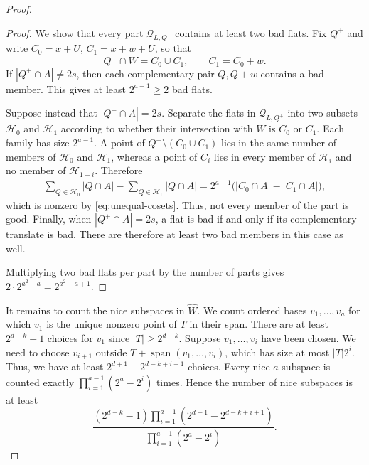 \documentclass[reqno]{amsart}
\theoremstyle{definition}
\theoremstyle{remark}
\newcommand{\cQ}{\mathcal Q}
\newcommand{\cH}{\mathcal H}
\DeclareMathOperator{\Span}{span}
\begin{document}
\begin{proof}
\begin{proof}
We show that every part $\cQ_{L, Q^+}$ contains at least two bad flats.  Fix $Q^+$ and
write $C_0 = x+U$, $C_1 = x+w+U$, so that
\[
  Q^+\cap W=C_0\cup C_1,
  \qquad C_1=C_0+w.
\]
If
$|Q^+\cap A|\ne 2s$, then each complementary pair
$Q,Q+w$ contains a bad member.  This gives at least
$2^{a-1}\ge2$ bad flats.

Suppose instead that $|Q^+\cap A|=2s$.  Separate the flats in $\cQ_{L, Q^+}$
into two subsets $\cH_0$ and $\cH_1$ according to whether their intersection with
$W$ is $C_0$ or $C_1$.  Each family has size $2^{a-1}$.  A point of
$Q^+\setminus(C_0\cup C_1)$ lies in the same number of members of
$\cH_0$ and $\cH_1$, whereas a point of $C_i$ lies in every member of
$\cH_i$ and no member of $\cH_{1-i}$.  Therefore
\[
\begin{split}
  \sum_{Q\in\cH_0}|Q\cap A|
  -\sum_{Q\in\cH_1}|Q\cap A|
  =2^{a-1}\bigl(|C_0\cap A|-|C_1\cap A|\bigr),
\end{split}
\]
which is nonzero by \eqref{eq:unequal-cosets}.  Thus, not every member
of the part is good.  Finally, when $|Q^+\cap A|=2s$, a flat is bad if
and only if its complementary translate is bad.  There are therefore
at least two bad members in this case as well.

Multiplying two bad flats per part by the number of parts gives
$2\cdot2^{a^2-a}=2^{a^2-a+1}$.
\end{proof}

It remains to count the nice subspaces in $\widehat W$. We count ordered bases $v_1,\ldots,v_a$ for which $v_1$ is the unique nonzero point of $T$ in
their span. There are at least $2^{d-k}-1$ choices for $v_1$ since $|T|\ge 2^{d-k}$. Suppose $v_1,\ldots,v_i$ have been chosen.
We need to choose $v_{i+1}$ outside $T+\Span(v_1,\ldots,v_i)$, which has size at most $|T|2^i$. Thus, we have at least $2^{d+1}-2^{d-k+i+1}$ choices. Every nice $a$-subspace is counted exactly $\prod_{i=1}^{a-1}(2^a-2^i)$ times. Hence the number of nice subspaces is at least
\begin{equation}\label{eq:nice-count}
  \frac{(2^{d-k}-1)
    \prod_{i=1}^{a-1}(2^{d+1}-2^{d-k+i+1})}
  {\prod_{i=1}^{a-1}(2^a-2^i)}.
\end{equation}


\end{proof}
\end{document}

